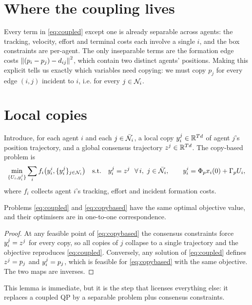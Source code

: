 \documentclass[11pt]{article}
\begin{document}
\section{Where the coupling lives}

Every term in \eqref{eq:coupled} except one is already separable across agents: the
tracking, velocity, effort and terminal costs each involve a single $i$, and the box
constraints are per-agent. The only inseparable terms are the formation edge costs
$\left\lVert (p_i - p_j) - d_{ij} \right\rVert^2$, which contain two distinct agents' positions. Making this
explicit tells us exactly which variables need copying: we must copy $p_j$ for every edge
$(i,j)$ incident to $i$, i.e. for every $j \in \mathcal{N}_i$.

\section{Local copies}

Introduce, for each agent $i$ and each $j \in \bar{\mathcal{N}}_i$, a local copy $y_{i}^{j} \in
\mathbb{R}^{Td}$ of agent $j$'s position trajectory, and a global consensus trajectory
$z^{j} \in \mathbb{R}^{Td}$. The copy-based problem is
\begin{equation}
\min_{\{U_i, y_{i}^{j}\}} \sum_i f_i\big(y_{i}^{i}, \{y_{i}^{j}\}_{j\in\mathcal{N}_i}\big)
\quad\text{s.t.}\quad
y_{i}^{j} = z^{j} \ \ \forall\, i,\ j\in\bar{\mathcal{N}}_i,
\qquad
y_{i}^{i} = \Phi_p x_i(0) + \Gamma_p U_i,
\label{eq:copybased}
\end{equation}
where $f_i$ collects agent $i$'s tracking, effort and incident formation costs.

\begin{lemma}[equivalence]
\label{lem:equiv}
Problems \eqref{eq:coupled} and \eqref{eq:copybased} have the same optimal objective value,
and their optimisers are in one-to-one correspondence.
\end{lemma}

\begin{proof}
At any feasible point of \eqref{eq:copybased} the consensus constraints force
$y_{i}^{j} = z^{j}$ for every copy, so all copies of $j$ collapse to a single
trajectory and the objective reproduces \eqref{eq:coupled}. Conversely, any solution of
\eqref{eq:coupled} defines $z^{j} = p_j$ and $y_{i}^{j} = p_j$, which is feasible for
\eqref{eq:copybased} with the same objective. The two maps are inverses.
\end{proof}

This lemma is immediate, but it is the step that licenses everything else: it replaces a
coupled QP by a separable problem plus consensus constraints.
\end{document}
